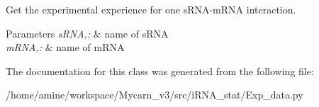 \-Get the experimental experience for one s\-R\-N\-A-\/m\-R\-N\-A interaction. 


\begin{DoxyParams}{\-Parameters}
{\em s\-R\-N\-A,\-:} & name of s\-R\-N\-A \\
\hline
{\em m\-R\-N\-A,\-:} & name of m\-R\-N\-A \\
\hline
\end{DoxyParams}


\-The documentation for this class was generated from the following file\-:\begin{DoxyCompactItemize}
\item 
/home/amine/workspace/\-Mycarn\-\_\-v3/src/i\-R\-N\-A\-\_\-stat/\-Exp\-\_\-data.\-py\end{DoxyCompactItemize}
